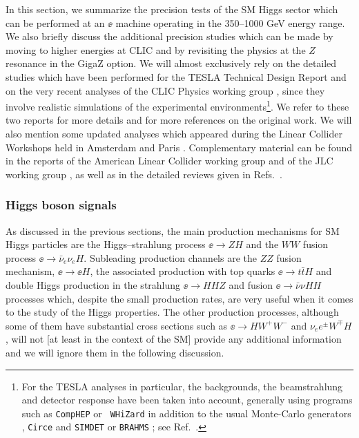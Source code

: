 {In this section, we  summarize the precision tests of the SM Higgs sector
which can be performed at an $\ee$ machine operating in the 350--1000 GeV
energy range. We also briefly discuss the additional precision studies
which can be made by moving to higher energies at CLIC and by revisiting the
physics at the $Z$ resonance in the GigaZ option. We will almost exclusively
rely on the detailed studies which have been performed for the TESLA Technical
Design Report \cite{TESLA,LC-GigaZ} and on the very recent analyses of the CLIC
Physics working group \cite{CLIC}, since they involve realistic simulations of
the experimental environments\footnote{For the TESLA analyses in particular,
the backgrounds, the beamstrahlung and detector response have been taken into
account, generally using  programs such as {\tt CompHEP} \cite{Comphep} or {\tt
WHiZard} \cite{Whizard} in addition to the usual Monte-Carlo generators
\cite{PYTHIA,HERWIGee,HZHA}, {\tt Circe} \cite{Circe} and {\tt SIMDET}
\cite{Simdet} or {\tt BRAHMS} \cite{Brahms}; see Ref.~\cite{Ronan}.}.  We refer
to these two reports for more details and for more references on the original
work.  We will also mention some updated analyses which appeared
during the Linear Collider Workshops held in Amsterdam \cite{Desch} and Paris
\cite{LCWS}. Complementary material can be found in the reports of the American
Linear Collider working group \cite{NLC} and of the JLC working group
\cite{JLC}, as well as in the detailed reviews given in
Refs.~\cite{ee-Review-old,LHC-LC}.  


\subsubsection{Higgs boson signals}

As discussed in the previous sections, the main production mechanisms for SM
Higgs particles are the Higgs--strahlung process $\ee \to ZH$ and the $WW$
fusion process $\ee \to \bar{\nu}_e \nu_e H$. Subleading production channels
are the $ZZ$ fusion mechanism, $\ee \to \ee H$,  the associated production with
top quarks $\ee \to t\bar{t}H$ and double Higgs production in the strahlung
$\ee \to HHZ$ and fusion $\ee \to \bar{\nu} \nu HH$ processes which, despite
the small production rates, are very useful when it comes to the study of the 
Higgs properties. The other production processes, although some of them have
substantial cross sections such as $\ee \to HW^+W^-$ and  $\nu_e e^\pm W^\mp
H$, will not [at least in the context of the SM] provide any additional
information and we will ignore them in the following discussion.\s 

}
